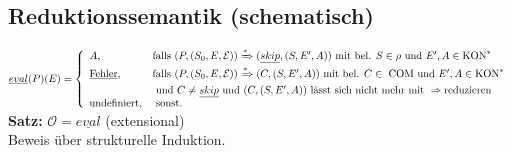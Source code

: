 \subsection{Reduktionssemantik (schematisch)}
$\underline{eval}(P)(E)=\left\lbrace\begin{array}{l l} A\text{,}&\text{falls } (P,(S_0,E,\mathcal{E}))\xRightarrow{*}(\underline{skip},(S,E',A))\text{ mit bel. } S \in \rho \text{ und } E', A \in \text{\lstinline!KON!}^*\\
\text{\underline{Fehler}}\text{,}&\text{falls }  (P,(S_0, E, \mathcal{E}))\xRightarrow{*}(C,(S,E',A)) \text{ mit bel. } C \in \text{ \lstinline!COM! und } E', A \in \text{\lstinline!KON!}^*\\& \text{ und } C \neq \underline{skip} \text{ und } (C, (S, E', A))\text{ lässt sich nicht mehr mit } \Rightarrow \text{reduzieren}\\
\text{undefiniert,}&\text{ sonst.}\\
\end{array}\right.$\\
\textbf{Satz:} $\mathcal{O} = \underline{eval}$ (extensional)\\
Beweis über strukturelle Induktion.
